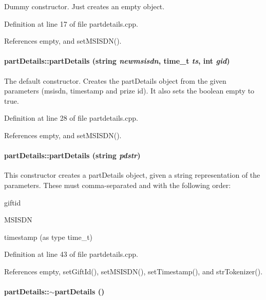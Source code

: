 Dummy constructor. Just creates an empty object. 

Definition at line 17 of file partdetails.cpp.

References empty, and set\-MSISDN().\hypertarget{classpartDetails_partDetailsa1}{
\paragraph[partDetails]{\setlength{\rightskip}{0pt plus 5cm}part\-Details::part\-Details (string {\em newmsisdn}, time\_\-t {\em ts}, int {\em gid})}\hfill}
\label{classpartDetails_partDetailsa1}


The default constructor. Creates the part\-Details object from the given parameters (msisdn, timestamp and prize id). It also sets the boolean empty to true. 

Definition at line 28 of file partdetails.cpp.

References empty, and set\-MSISDN().\hypertarget{classpartDetails_partDetailsa2}{
\paragraph[partDetails]{\setlength{\rightskip}{0pt plus 5cm}part\-Details::part\-Details (string {\em pdstr})}\hfill}
\label{classpartDetails_partDetailsa2}


This constructor creates a part\-Details object, given a string representation of the parameters. These must comma-separated and with the following order:\begin{CompactItemize}
\item 
giftid\item 
MSISDN\item 
timestamp (as type time\_\-t) \end{CompactItemize}


Definition at line 43 of file partdetails.cpp.

References empty, set\-Gift\-Id(), set\-MSISDN(), set\-Timestamp(), and str\-Tokenizer().\hypertarget{classpartDetails_partDetailsa3}{
\paragraph[$\sim$partDetails]{\setlength{\rightskip}{0pt plus 5cm}part\-Details::$\sim$part\-Details ()}\hfill}
\label{classpartDetails_partDetailsa3}


